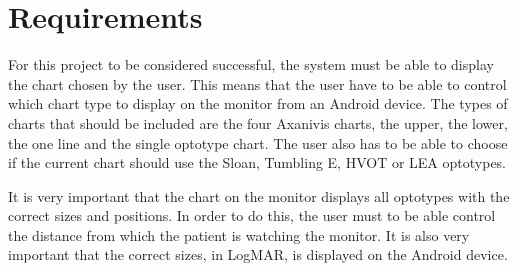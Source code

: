 \documentclass[12pt,a4paper,notitlepage]{report}
\begin{document}

\section{Requirements}
For this project to be considered successful, the system must be able to display the chart chosen by the user. This means that the user have to be able to control which chart type to display on the monitor from an Android device. The types of charts that should be included are the four Axanivis charts, the upper, the lower, the one line and the single optotype chart. The user also has to be able to choose if the current chart should use the Sloan, Tumbling E, HVOT or LEA optotypes.

It is very important that the chart on the monitor displays all optotypes with the correct sizes and positions. In order to do this, the user must to be able control the distance from which the patient is watching the monitor. It is also very important that the correct sizes, in LogMAR, is displayed on the Android device.
\end{document}
